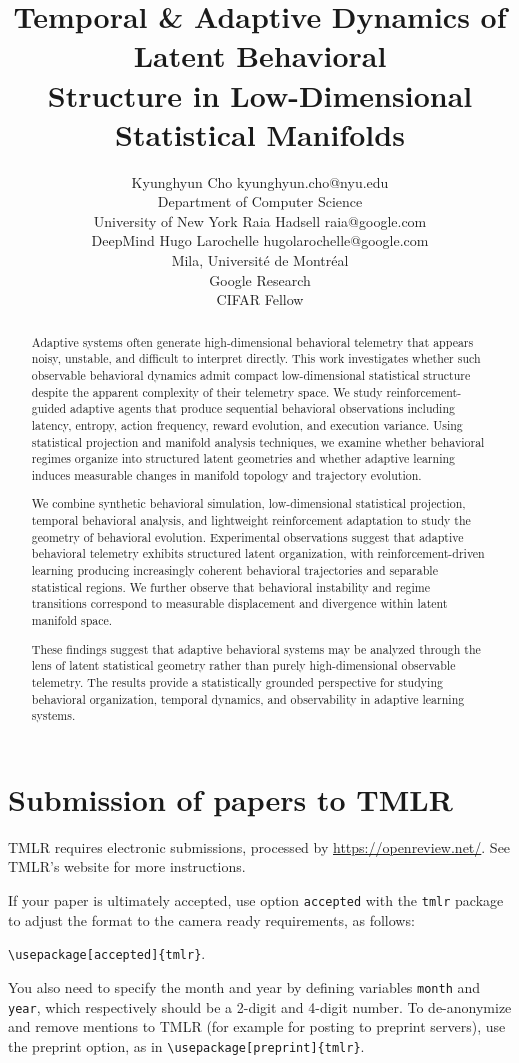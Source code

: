 \documentclass[10pt]{article} %
\title{Temporal \& Adaptive Dynamics of Latent Behavioral \\Structure in Low-Dimensional Statistical Manifolds}
\author{\name Kyunghyun Cho \email kyunghyun.cho@nyu.edu \\
      \addr Department of Computer Science\\
      University of New York
      \AND
      \name Raia Hadsell \email raia@google.com \\
      \addr DeepMind
      \AND
      \name Hugo Larochelle \email hugolarochelle@google.com\\
      \addr Mila, Universit\'e de Montr\'eal \\
      Google Research\\
      CIFAR Fellow}
\begin{document}
\maketitle

\begin{abstract}
Adaptive systems often generate high-dimensional behavioral telemetry that appears noisy, unstable, and difficult to interpret directly. This work investigates whether such observable behavioral dynamics admit compact low-dimensional statistical structure despite the apparent complexity of their telemetry space. We study reinforcement-guided adaptive agents that produce sequential behavioral observations including latency, entropy, action frequency, reward evolution, and execution variance. Using statistical projection and manifold analysis techniques, we examine whether behavioral regimes organize into structured latent geometries and whether adaptive learning induces measurable changes in manifold topology and trajectory evolution.

We combine synthetic behavioral simulation, low-dimensional statistical projection, temporal behavioral analysis, and lightweight reinforcement adaptation to study the geometry of behavioral evolution. Experimental observations suggest that adaptive behavioral telemetry exhibits structured latent organization, with reinforcement-driven learning producing increasingly coherent behavioral trajectories and separable statistical regions. We further observe that behavioral instability and regime transitions correspond to measurable displacement and divergence within latent manifold space.

These findings suggest that adaptive behavioral systems may be analyzed through the lens of latent statistical geometry rather than purely high-dimensional observable telemetry. The results provide a statistically grounded perspective for studying behavioral organization, temporal dynamics, and observability in adaptive learning systems.
\end{abstract}

\section{Submission of papers to TMLR}

TMLR requires electronic submissions, processed by
\url{https://openreview.net/}. See TMLR's website for more instructions.

If your paper is ultimately accepted, use option {\tt accepted} with the {\tt tmlr} 
package to adjust the format to the camera ready requirements, as follows:
\begin{center}  
  {\tt {\textbackslash}usepackage[accepted]\{tmlr\}}. 
\end{center}
You also need to specify the month and year
by defining variables {\tt month} and {\tt year}, which respectively
should be a 2-digit and 4-digit number. To de-anonymize and remove mentions
to TMLR (for example for posting to preprint servers), use the preprint option,
as in {\tt {\textbackslash}usepackage[preprint]\{tmlr\}}. 
\end{document}
